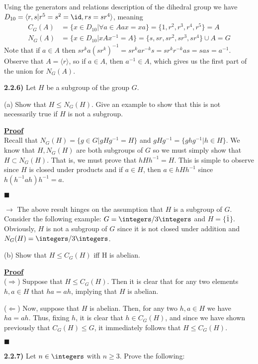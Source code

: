\documentclass[12pt,a4paper]{article}
\newcommand{\prob}[2]{\textbf{#1)} #2}
\newenvironment{proof}
{
\textbf{\underline{Proof}} \\
}
{
\begin{flushright}
$\blacksquare$
\end{flushright}}
\begin{document}
Using the generators and relations description of the dihedral group we have $D_{10} = \langle r,s | r^5 = s^2 = \id, rs = sr^{4} \rangle$, meaning
\begin{align*}
C_G(A) &= \{x \in D_{10} | \forall a \in A ax = xa \} = \{1,r^2,r^3,r^4,r^5\} = A  \\
N_G(A) &= \{x \in D_{10} | xAx^{-1} = A \} = \{s,sr,sr^2,sr^3,sr^4\} \cup A = G
\end{align*}
Note that if $a \in A$ then $sr^{k}a(sr^{k})^{-1} = sr^{k}ar^{-k}s = sr^{k}r^{-k}as = sas = a^{-1}$. Observe that $A = \langle r \rangle$, so if $a \in A$, then $a^{-1} \in A$, which gives us the first part of the union for $N_G(A)$.

\prob{2.2.6}{Let $H$ be a subgroup of the group $G$.}

(a) Show that $H \leq N_G(H)$. Give an example to show that this is not necessarily true if $H$ is not a subgroup.

\begin{proof}
Recall that $N_{G}(H) = \{g \in G | gHg^{-1} = H\}$ and $gHg^{-1} = \{ghg^{-1} | h \in H\}$. We know that $H,N_G(H)$ are both subgroups of $G$ so we must simply show that $H \subset N_G(H)$. That is, we must prove that $hHh^{-1} = H$. This is simple to observe since $H$ is closed under products and if $a \in H$, then $a \in hHh^{-1}$ since $h(h^{-1}ah)h^{-1} = a$.
\end{proof}

$\rightarrow$ The above result hinges on the assumption that $H$ is a subgroup of $G$. Consider the following example: $G = \integers/3\integers$ and $H = \{\bar{1}\}$. Obviously, $H$ is not a subgroup of $G$ since it is not closed under addition and $N_G(H) = \integers/3\integers$.

(b) Show that $H \leq C_G(H)$ iff H is abelian.

\begin{proof}
($\Rightarrow$) Suppose that $H \leq C_G(H)$. Then it is clear that for any two elements $h,a \in H$ that $ha = ah$, implying that $H$ is abelian. 

($\Leftarrow$) Now, suppose that $H$ is abelian. Then, for any two $h,a \in H$ we have $ha = ah$. Thus, fixing $h$, it is clear that $h \in C_G(H)$, and since we have shown previously that $C_G(H) \leq G$, it immediately follows that $H \leq C_G(H)$.
\end{proof}

\prob{2.2.7}{Let $n \in \integers$ with $n \geq 3$. Prove the following:}
\end{document}
